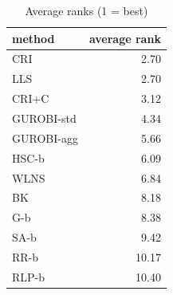 \begin{table}[htbp]
\centering
\small
\caption{Average ranks (1 = best)}
\label{tab:E4a_equal_budgets_b10_ranks}
\begin{tabular}{lr}
\toprule
method & average rank \\
\midrule
CRI & 2.70 \\
LLS & 2.70 \\
CRI+C & 3.12 \\
GUROBI-std & 4.34 \\
GUROBI-agg & 5.66 \\
HSC-b & 6.09 \\
WLNS & 6.84 \\
BK & 8.18 \\
G-b & 8.38 \\
SA-b & 9.42 \\
RR-b & 10.17 \\
RLP-b & 10.40 \\
\bottomrule
\end{tabular}
\end{table}
